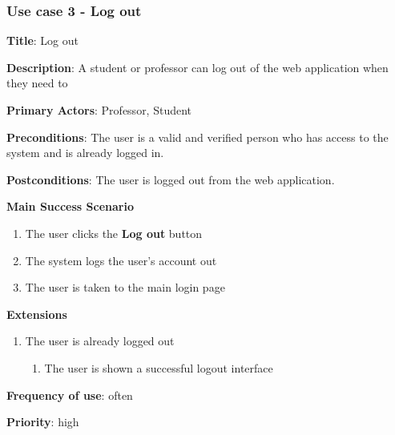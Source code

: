\documentclass[singlespacing,12pt,parskip,headsepline,consistentlayout]{article}
\begin{document}
\pagebreak
\subsubsection{Use case 3 - Log out}
\begin{flushleft}
\vspace{0.2cm}
\hline
\vspace{0.2cm}
{\bfseries Title}: {Log out}

{\bfseries Description}: {A student or professor can log out of the web application when they need to}

{\bfseries Primary Actors}: {Professor, Student}

{\bfseries Preconditions}: The user is a valid and verified person who has access to the system and is already logged in.

{\bfseries Postconditions}: {The user is logged out from the web application.}

{\bfseries Main Success Scenario}

\begin{enumerate}
      \item The user clicks the {\bfseries Log out} button
      \item The system logs the user’s account out
      \item The user is taken to the main login page
\end{enumerate}
 
{\bfseries Extensions}

\begin{enumerate}
  \item The user is already logged out
  \begin{enumerate}
      \item The user is shown a successful logout interface
  \end{enumerate}
\end{enumerate}

{\bfseries Frequency of use}: often

{\bfseries Priority}: high

\end{flushleft}

\pagebreak
\end{document}

